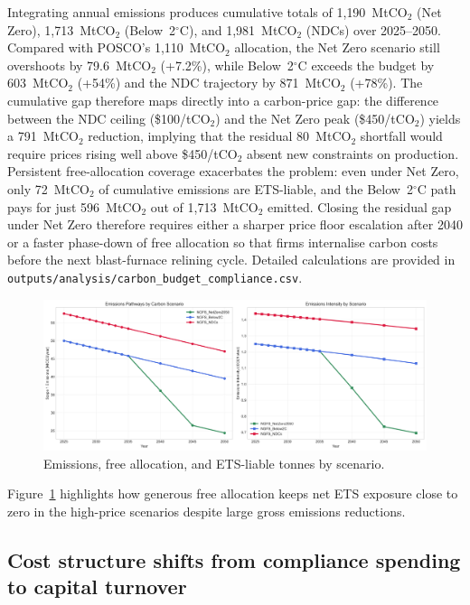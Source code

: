 \documentclass[preprint,1p,authoryear]{elsarticle}
\begin{document}
Integrating annual emissions produces cumulative totals of 1{,}190~MtCO$_2$ (Net Zero), 1{,}713~MtCO$_2$ (Below~2$^\circ$C), and 1{,}981~MtCO$_2$ (NDCs) over 2025--2050. Compared with POSCO's 1{,}110~MtCO$_2$ allocation, the Net Zero scenario still overshoots by 79.6~MtCO$_2$ (+7.2\%), while Below~2$^\circ$C exceeds the budget by 603~MtCO$_2$ (+54\%) and the NDC trajectory by 871~MtCO$_2$ (+78\%). The cumulative gap therefore maps directly into a carbon-price gap: the difference between the NDC ceiling (\$100/tCO$_2$) and the Net Zero peak (\$450/tCO$_2$) yields a 791~MtCO$_2$ reduction, implying that the residual 80~MtCO$_2$ shortfall would require prices rising well above \$450/tCO$_2$ absent new constraints on production. Persistent free-allocation coverage exacerbates the problem: even under Net Zero, only 72~MtCO$_2$ of cumulative emissions are ETS-liable, and the Below~2$^\circ$C path pays for just 596~MtCO$_2$ out of 1,713~MtCO$_2$ emitted. Closing the residual gap under Net Zero therefore requires either a sharper price floor escalation after 2040 or a faster phase-down of free allocation so that firms internalise carbon costs before the next blast-furnace relining cycle. Detailed calculations are provided in \texttt{outputs/analysis/carbon\_budget\_compliance.csv}.

\begin{figure}[!t]
  \centering
  \includegraphics[width=0.85\linewidth]{emissions_pathways}
  \caption{Emissions, free allocation, and ETS-liable tonnes by scenario.}
  \label{fig:emissions-pathways}
\end{figure}

Figure~\ref{fig:emissions-pathways} highlights how generous free allocation keeps net ETS exposure close to zero in the high-price scenarios despite large gross emissions reductions.

\subsection{Cost structure shifts from compliance spending to capital turnover}
\end{document}
